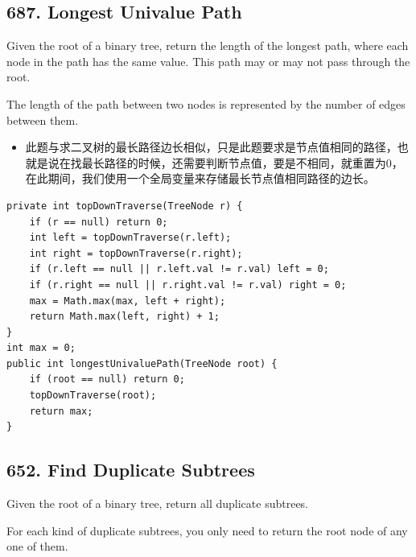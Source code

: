 \documentclass[9pt, b5paper]{article}
\begin{document}
\subsection{687. Longest Univalue Path}
\label{sec-15-2}
Given the root of a binary tree, return the length of the longest path, where each node in the path has the same value. This path may or may not pass through the root.

The length of the path between two nodes is represented by the number of edges between them.
\begin{itemize}
\item 此题与求二叉树的最长路径边长相似，只是此题要求是节点值相同的路径，也就是说在找最长路径的时候，还需要判断节点值，要是不相同，就重置为0，在此期间，我们使用一个全局变量来存储最长节点值相同路径的边长。
\end{itemize}
\begin{verbatim}
private int topDownTraverse(TreeNode r) { 
    if (r == null) return 0;
    int left = topDownTraverse(r.left);
    int right = topDownTraverse(r.right);
    if (r.left == null || r.left.val != r.val) left = 0;
    if (r.right == null || r.right.val != r.val) right = 0;
    max = Math.max(max, left + right);
    return Math.max(left, right) + 1;
}
int max = 0;
public int longestUnivaluePath(TreeNode root) {
    if (root == null) return 0;
    topDownTraverse(root);
    return max;
}
\end{verbatim}

\subsection{652. Find Duplicate Subtrees}
\label{sec-15-3}
Given the root of a binary tree, return all duplicate subtrees.

For each kind of duplicate subtrees, you only need to return the root node of any one of them.
\end{document}
